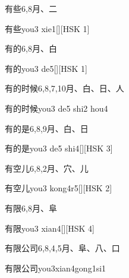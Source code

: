 \begin{Entry}{有些}{6,8}{⽉、⼆}
  \begin{Phonetics}{有些}{you3 xie1}[][HSK 1]
  \end{Phonetics}
\end{Entry}

\begin{Entry}{有的}{6,8}{⽉、⽩}
  \begin{Phonetics}{有的}{you3 de5}[][HSK 1]
  \end{Phonetics}
\end{Entry}

\begin{Entry}{有的时候}{6,8,7,10}{⽉、⽩、⽇、⼈}
  \begin{Phonetics}{有的时候}{you3 de5 shi2 hou4}
  \end{Phonetics}
\end{Entry}

\begin{Entry}{有的是}{6,8,9}{⽉、⽩、⽇}
  \begin{Phonetics}{有的是}{you3 de5 shi4}[][HSK 3]
  \end{Phonetics}
\end{Entry}

\begin{Entry}{有空儿}{6,8,2}{⽉、⽳、⼉}
  \begin{Phonetics}{有空儿}{you3 kong4r5}[][HSK 2]
  \end{Phonetics}
\end{Entry}

\begin{Entry}{有限}{6,8}{⽉、⾩}
  \begin{Phonetics}{有限}{you3 xian4}[][HSK 4]
  \end{Phonetics}
\end{Entry}

\begin{Entry}{有限公司}{6,8,4,5}{⽉、⾩、⼋、⼝}
  \begin{Phonetics}{有限公司}{you3xian4gong1si1}
  \end{Phonetics}
\end{Entry}

